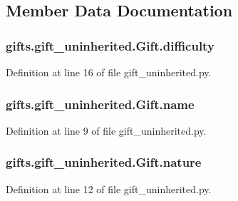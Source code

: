 \subsection{Member Data Documentation}
\subsubsection[{\texorpdfstring{difficulty}{difficulty}}]{\setlength{\rightskip}{0pt plus 5cm}gifts.\+gift\+\_\+uninherited.\+Gift.\+difficulty}\hypertarget{classgifts_1_1gift__uninherited_1_1_gift_ae679bef0b9d26aad227c52602b8575ee}{}\label{classgifts_1_1gift__uninherited_1_1_gift_ae679bef0b9d26aad227c52602b8575ee}


Definition at line 16 of file gift\+\_\+uninherited.\+py.

\subsubsection[{\texorpdfstring{name}{name}}]{\setlength{\rightskip}{0pt plus 5cm}gifts.\+gift\+\_\+uninherited.\+Gift.\+name}\hypertarget{classgifts_1_1gift__uninherited_1_1_gift_abe76c25355d683ddd1e2383f139e4f8e}{}\label{classgifts_1_1gift__uninherited_1_1_gift_abe76c25355d683ddd1e2383f139e4f8e}


Definition at line 9 of file gift\+\_\+uninherited.\+py.

\subsubsection[{\texorpdfstring{nature}{nature}}]{\setlength{\rightskip}{0pt plus 5cm}gifts.\+gift\+\_\+uninherited.\+Gift.\+nature}\hypertarget{classgifts_1_1gift__uninherited_1_1_gift_ac21294038fa6ce0cd1a192e303fc1920}{}\label{classgifts_1_1gift__uninherited_1_1_gift_ac21294038fa6ce0cd1a192e303fc1920}


Definition at line 12 of file gift\+\_\+uninherited.\+py.

